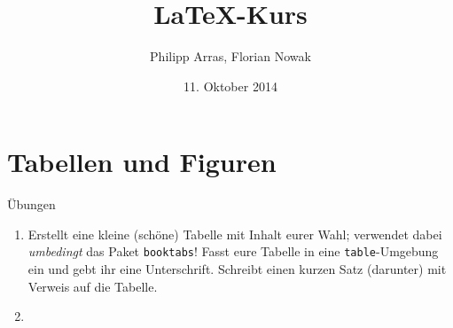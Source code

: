 \documentclass[11pt]{beamer}
\author{Philipp Arras, Florian Nowak}
\title{\LaTeX -Kurs}
\date{11. Oktober 2014}
\begin{document}


\section{Tabellen und Figuren}
\begin{frame}{Übungen}
\begin{enumerate}
\item Erstellt eine kleine (schöne) Tabelle mit Inhalt eurer Wahl; verwendet dabei \emph{umbedingt} das Paket \texttt{booktabs}! Fasst eure Tabelle in eine \texttt{table}-Umgebung ein und gebt ihr eine Unterschrift. Schreibt einen kurzen Satz (darunter) mit Verweis auf die Tabelle.
\item 
\end{enumerate}
\end{frame}
\end{document}
